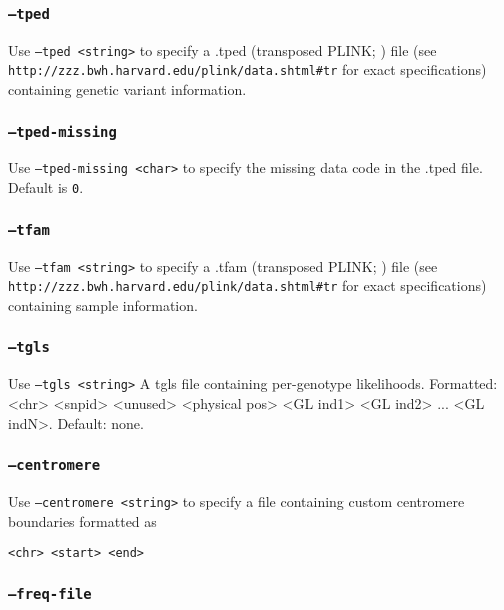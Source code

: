\documentclass[12pt]{article}%
\begin{document}
\subsubsection{{\tt --tped}}

Use {\tt --tped <string>} to specify a .tped (transposed PLINK; \cite{PurcellEtAl07}) file (see \\{\tt http://zzz.bwh.harvard.edu/plink/data.shtml\#tr} for exact specifications) containing genetic variant information.  

\subsubsection{{\tt --tped-missing}}

Use {\tt --tped-missing <char>} to specify the missing data code in the .tped file.  Default is {\tt 0}.  


\subsubsection{{\tt --tfam}}

Use {\tt --tfam <string>} to specify a .tfam (transposed PLINK; \cite{PurcellEtAl07}) file (see \\{\tt http://zzz.bwh.harvard.edu/plink/data.shtml\#tr} for exact specifications) containing sample information.

\subsubsection{{\tt --tgls}}

Use {\tt --tgls <string>} A tgls file containing per-genotype likelihoods. Formatted: <chr> <snpid> <unused> <physical pos> <GL ind1> <GL ind2> ... <GL indN>. Default: none.

\subsubsection{{\tt --centromere}}

Use {\tt --centromere <string>} to specify a file containing custom centromere boundaries formatted as
\begin{lstlisting}
<chr> <start> <end>
\end{lstlisting}

\subsubsection{{\tt --freq-file}}
\end{document}
